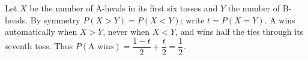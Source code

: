 Let $X$ be the number of A-heads in its first six tosses and $Y$ the number of B-heads. By symmetry $P(X>Y)=P(X<Y)$; write $t=P(X=Y)$. A wins automatically when $X>Y$, never when $X<Y$, and wins half the ties through its seventh toss. Thus $P(\text{A wins})=\dfrac{1-t}{2}+\dfrac{t}{2}=\boxed{\dfrac{1}{2}}$.
